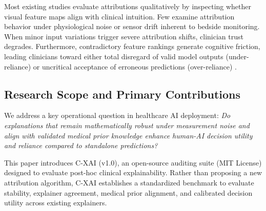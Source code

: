 \documentclass[3p,times,procedia]{elsarticle}
\theoremstyle{definition}
\begin{document}
Most existing studies evaluate attributions qualitatively by inspecting whether visual feature maps align with clinical intuition. Few examine attribution behavior under physiological noise or sensor drift inherent to bedside monitoring. When minor input variations trigger severe attribution shifts, clinician trust degrades. Furthermore, contradictory feature rankings generate cognitive friction, leading clinicians toward either total disregard of valid model outputs (under-reliance) or uncritical acceptance of erroneous predictions (over-reliance) \cite{mahmood2022quantifying, bansal2021does, bucinca2021trust}.

\subsection{Research Scope and Primary Contributions}
We address a key operational question in healthcare AI deployment: \textit{Do explanations that remain mathematically robust under measurement noise and align with validated medical prior knowledge enhance human-AI decision utility and reliance compared to standalone predictions?}

This paper introduces C-XAI (v1.0), an open-source auditing suite (MIT License) designed to evaluate post-hoc clinical explainability. Rather than proposing a new attribution algorithm, C-XAI establishes a standardized benchmark to evaluate stability, explainer agreement, medical prior alignment, and calibrated decision utility across existing explainers.
\end{document}
